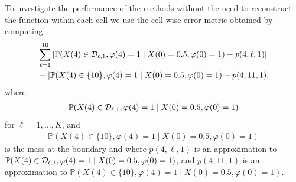 To investigate the performance of the methods without the need to reconstruct the function within each cell we use the cell-wise error metric obtained by computing 
\begin{align}
	&\sum_{\ell=1}^{10} \left|\mathbb P(X(4)\in\mathcal{D}_{\ell,1}, \varphi(4)=1\mid X(0)=0.5,\varphi(0)=1)-p(4,\ell,1)\right|\nonumber 
	\\&+\left|\mathbb P(X(4)\in\{10\}, \varphi(4)=1\mid X(0)=0.5,\varphi(0)=1)-p(4,11,1)\right| \label{eqn: cell errors}
\end{align}
where 
\begin{align}
	\mathbb P(X(4)\in\mathcal{D}_{\ell,1}, \varphi(4)=1\mid X(0)=0.5,\varphi(0)=1) \label{eqn: cell probs}
\end{align}
for \(\ell=1,\dots,K\), and 
\begin{align}
	\mathbb P(X(4)\in\{10\}, \varphi(4)=1\mid X(0)=0.5,\varphi(0)=1) \label{eqn: cell probs boundary}
\end{align}
is the mass at the boundary and where \(p(4,\ell,1)\) is an approximation to \(\mathbb P(X(4)\in\mathcal{D}_{\ell,1}, \varphi(4)=1\mid X(0)=0.5,\varphi(0)=1)\), and \(p(4,11,1)\) is an approximation to \(\mathbb P(X(4)\in\{10\}, \varphi(4)=1\mid X(0)=0.5,\varphi(0)=1)\).

